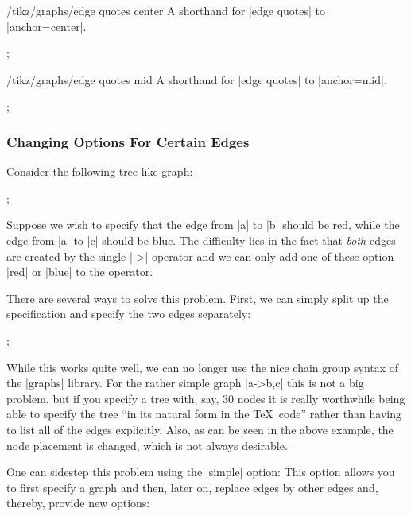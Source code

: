 \begin{key}{/tikz/graphs/edge quotes center}
  A shorthand for |edge quotes| to |anchor=center|.
\begin{codeexample}[]
\tikz {};
\end{codeexample}
\end{key}

\begin{key}{/tikz/graphs/edge quotes mid}
  A shorthand for |edge quotes| to |anchor=mid|.
\begin{codeexample}[]
\tikz {};
\end{codeexample}
\end{key}



\subsubsection{Changing Options For Certain Edges}


Consider the following tree-like graph:

\begin{codeexample}[]
\tikz {};
\end{codeexample}

Suppose we wish to specify that the edge from |a| to |b| should be
red, while the edge from |a| to |c| should be blue. The difficulty
lies in the fact that \emph{both} edges are created by the single |->|
operator and we can only add one of these option |red| or |blue| to
the operator.

There are several ways to solve this problem. First, we can simply
split up the specification and specify the two edges separately:

\begin{codeexample}[]
\tikz {};  
\end{codeexample}
While this works quite well, we can no longer use the nice chain group
syntax of the |graphs| library. For the rather simple graph |a->{b,c}|
this is not a big problem, but if you specify a tree with, say, 30
nodes it is really worthwhile being able to specify the tree ``in its
natural form in the \TeX\ code'' rather than having to list all of the
edges explicitly. Also, as can be seen in the above example, the
node placement is changed, which is not always desirable. 

One can sidestep this problem using the |simple| option: This option
allows you to first specify a graph and then, later on, replace edges
by other edges and, thereby, provide new options:

